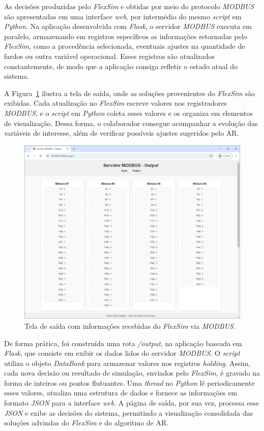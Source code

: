\documentclass[
    12pt,                %
    openright,           %
    oneside,             %
    a4paper,             %
    english,             %
    spanish,             %
    brazil               %
]{ufscar}
\begin{document}
As decisões produzidas pelo \textit{FlexSim} e obtidas por meio do protocolo \textit{MODBUS} são apresentadas em uma interface \textit{web}, por intermédio do mesmo \textit{script} em \textit{Python}. Na aplicação desenvolvida com \textit{Flask}, o servidor \textit{MODBUS} executa em paralelo, armazenando em registros específicos as informações retornadas pelo \textit{FlexSim}, como a procedência selecionada, eventuais ajustes na quantidade de fardos ou outra variável operacional. Esses registros são atualizados constantemente, de modo que a aplicação consiga refletir o estado atual do sistema.

A Figura~\ref{figure:TelaOutput} ilustra a tela de saída, onde as soluções provenientes do \textit{FlexSim} são exibidas. Cada atualização no \textit{FlexSim} escreve valores nos registradores \textit{MODBUS}, e o \textit{script} em \textit{Python} coleta esses valores e os organiza em elementos de visualização. Dessa forma, o colaborador consegue acompanhar a evolução das variáveis de interesse, além de verificar possíveis ajustes sugeridos pelo AR.

\begin{figure}[hbt]
\centering
  \caption{Tela de saída com informações recebidas do \textit{FlexSim} via \textit{MODBUS}.}  
  \label{figure:TelaOutput}
  \includegraphics[width=1\textwidth]{figures/TelaOutput.png}
\end{figure}


De forma prática, foi construída uma rota \textit{/output}, na aplicação baseada em \textit{Flask}, que consiste em exibir os dados lidos do servidor \textit{MODBUS}. O \textit{script} utiliza o objeto \textit{DataBank} para armazenar valores nos registros \textit{holding}. Assim, cada nova decisão ou resultado de simulação, enviados pelo \textit{FlexSim}, é gravado na forma de inteiros ou pontos flutuantes. Uma \textit{thread} no \textit{Python} lê periodicamente esses valores, atualiza uma estrutura de dados e fornece as informações em formato \textit{JSON} para a interface \textit{web}. A página de saída, por sua vez, processa esse \textit{JSON} e exibe as decisões do sistema, permitindo a visualização consolidada das soluções advindas do \textit{FlexSim} e do algoritmo de AR.
\end{document}
